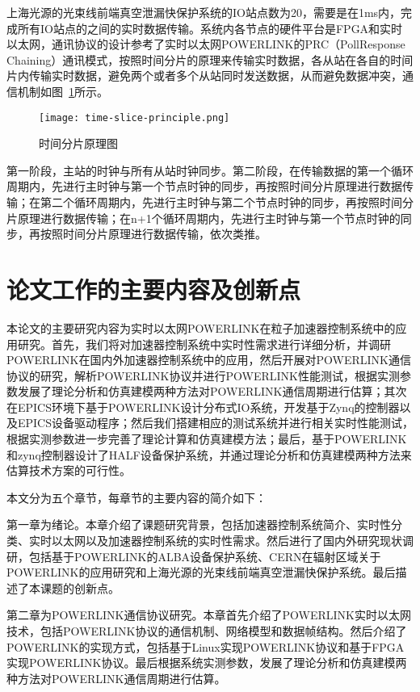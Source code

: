上海光源的光束线前端真空泄漏快保护系统的IO站点数为20，需要是在1ms内，完成所有IO站点的之间的实时数据传输\cite{liu-2010}。系统内各节点的硬件平台是FPGA和实时以太网，通讯协议的设计参考了实时以太网POWERLINK的PRC（PollResponse Chaining）通讯模式，按照时间分片的原理来传输实时数据，各从站在各自的时间片内传输实时数据，避免两个或者多个从站同时发送数据，从而避免数据冲突，通信机制如图~\ref{fig:time-slice-principle}所示。

\begin{figure}[!htb]
	\centering
	\texttt{[image: time-slice-principle.png]}
	\caption{时间分片原理图}
	\label{fig:time-slice-principle}
\end{figure}

第一阶段，主站的时钟与所有从站时钟同步。第二阶段，在传输数据的第一个循环周期内，先进行主时钟与第一个节点时钟的同步，再按照时间分片原理进行数据传输；在第二个循环周期内，先进行主时钟与第二个节点时钟的同步，再按照时间分片原理进行数据传输；在n+1个循环周期内，先进行主时钟与第一个节点时钟的同步，再按照时间分片原理进行数据传输，依次类推。


\section{论文工作的主要内容及创新点}

本论文的主要研究内容为实时以太网POWERLINK在粒子加速器控制系统中的应用研究。首先，我们将对加速器控制系统中实时性需求进行详细分析，并调研POWERLINK在国内外加速器控制系统中的应用，然后开展对POWERLINK通信协议的研究，解析POWERLINK协议并进行POWERLINK性能测试，根据实测参数发展了理论分析和仿真建模两种方法对POWERLINK通信周期进行估算；其次在EPICS环境下基于POWERLINK设计分布式IO系统，开发基于Zynq的控制器以及EPICS设备驱动程序；然后我们搭建相应的测试系统并进行相关实时性能测试，根据实测参数进一步完善了理论计算和仿真建模方法；最后，基于POWERLINK和zynq控制器设计了HALF设备保护系统，并通过理论分析和仿真建模两种方法来估算技术方案的可行性。

本文分为五个章节，每章节的主要内容的简介如下：

第一章为绪论。本章介绍了课题研究背景，包括加速器控制系统简介、实时性分类、实时以太网以及加速器控制系统的实时性需求。然后进行了国内外研究现状调研，包括基于POWERLINK的ALBA设备保护系统、CERN在辐射区域关于POWERLINK的应用研究和上海光源的光束线前端真空泄漏快保护系统。最后描述了本课题的创新点。

第二章为POWERLINK通信协议研究。本章首先介绍了POWERLINK实时以太网技术，包括POWERLINK协议的通信机制、网络模型和数据帧结构。然后介绍了POWERLINK的实现方式，包括基于Linux实现POWERLINK协议和基于FPGA实现POWERLINK协议。最后根据系统实测参数，发展了理论分析和仿真建模两种方法对POWERLINK通信周期进行估算。

